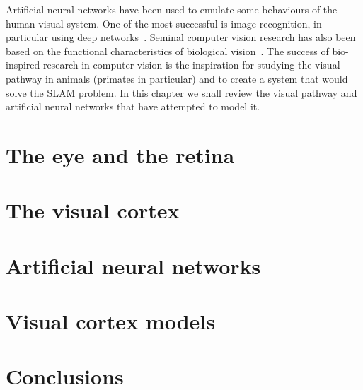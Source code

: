 
Artificial neural networks have been used to emulate some behaviours of the human visual system. One of the most successful is image recognition, in particular using deep networks~\cite{deep-nets-hinton2006fast,krizhevsky2012imagenet}. Seminal computer vision research has also been based on the functional characteristics of biological vision~\cite{lowe1999object,lowe2004distinctive,alahi2012freak}. The success of bio-inspired research in computer vision is the inspiration for studying the visual pathway in animals (primates in particular) and to create a system that would solve the SLAM problem. In this chapter we shall review the visual pathway and artificial neural networks that have attempted to model it. 

\section{The eye and the retina}
\label{sec:vision:eye}


\section{The visual cortex}
\label{sec:vision:cortex}


\section{Artificial neural networks}


\section{Visual cortex models}


\section{Conclusions}
\label{sec:vision:conclusions}

